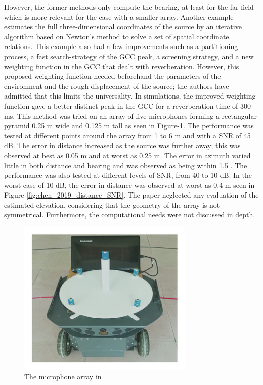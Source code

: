 \documentclass{report}
\begin{document}
However, the former methods only compute the bearing, at least for the far field which is more relevant for the case with a smaller array. Another example \cite{chen_sound_2019} estimates the full three-dimensional coordinates of the source by an iterative algorithm based on Newton's method to solve a set of spatial coordinate relations. This example also had a few improvements such as a partitioning process, a fast search-strategy of the GCC peak, a screening strategy, and a new weighting function in the GCC that dealt with reverberation. However, this proposed weighting function needed beforehand the parameters of the environment and the rough displacement of the source; the authors have admitted that this limits the universality. In simulations, the improved weighting function gave a better distinct peak in the GCC for a reverberation-time of 300 \si{ms}. This method was tried on an array of five microphones forming a rectangular pyramid 0.25 \si{m} wide and 0.125 \si{m} tall as seen in Figure-\ref{fig:chen_2019_array}. The performance was tested at different points around the array from 1 to 6 \si{m} and with a SNR of 45 \si{dB}. The error in distance increased as the source was further away; this was observed at best as 0.05 \si{m} and at worst as 0.25 \si{m}. The error in azimuth varied little in both distance and bearing and was observed as being within 1.5 \si{\deg}. The performance was also tested at different levels of SNR, from 40 to 10 \si{dB}. In the worst case of 10 \si{dB}, the error in distance was observed at worst as 0.4 \si{m} seen in Figure-\ref{fig:chen_2019_distance_SNR}. The paper neglected any evaluation of the estimated elevation, considering that the geometry of the array is not symmetrical. Furthermore, the computational needs were not discussed in depth.

\begin{figure}[H]
\includegraphics[width=0.75\textwidth]{./chen_2019/array.jpg}
\centering
\caption{The microphone array in \cite{chen_sound_2019}}
\label{fig:chen_2019_array}
\centering
\end{figure}
\end{document}
